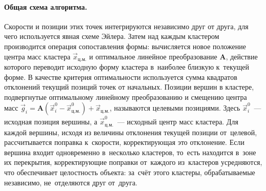 \documentclass[a4paper, 14pt, titlepage]{extarticle}
\newcommand{\vect}[1]{\vec{#1}} %
\newcommand{\matx}[1]{\mathbf{#1}} %
\begin{document}
        \paragraph{Общая схема алгоритма.} Скорости и позиции этих точек интегрируются независимо
        друг от друга, для чего используется явная схеме Эйлера. Затем над каждым кластером
        производится операция сопоставления формы: вычисляется новое положение центра масс кластера
        $\vect{x}_{ц.м.}$ и оптимальное линейное преобразование $\matx A$, действие которого
        переводит исходную форму кластера в~наиболее близкую к~текущей форме. В качестве критерия
        оптимальности используется сумма квадратов отклонений текущий позиций точек от начальных. Позиции
        вершин в кластере, подвергнутые оптимальному линейному преобразованию и смещению центра масс
        $\vect{g}_i = \matx{A} (\vect{x}^0_i - \vect{x}^0_{ц.м.}) + \vect{x}_{ц.м.}$,
        называются целевыми позициями. Здесь $\vect{x}^0_i$~--- исходная позиция вершины, а
        $\vect{x}^0_{ц.м.}$~--- исходный центр масс кластера. Для каждой вершины, исходя из величины
        отклонения текущей позиции от~целевой, рассчитывается поправка к~скорости, корректирующая
        это отклонение. Если вершина входит одновременно в~несколько кластеров, то~есть находится
        в~зоне их перекрытия, корректирующие поправки от~каждого из~кластеров усредняются, что
        обеспечивает целостность объекта: за~счёт этого кластеры, обрабатываемые независимо,
        не~отделяются друг от~друга.
\end{document}
